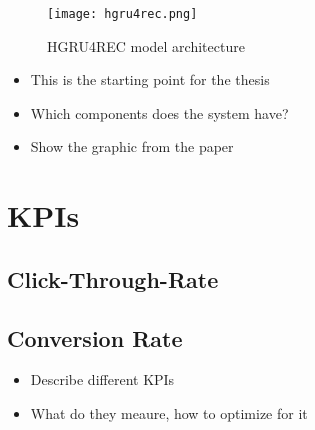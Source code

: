 \begin{figure}[ht]
	\centering
	\captionsetup{width=0.8\textwidth}
    \texttt{[image: hgru4rec.png]}
    \caption{HGRU4REC model architecture}
    \label{fig:hgru4rec}
\end{figure}

\begin{itemize}
    \item This is the starting point for the thesis
    \item Which components does the system have?
    \item Show the graphic from the paper
\end{itemize}
\cite{hierarchical}

\section{KPIs}
\subsection{Click-Through-Rate}
\subsection{Conversion Rate}\label{sec:conversion_rate}
\begin{itemize}
\item Describe different KPIs
\item What do they meaure, how to optimize for it
\end{itemize}